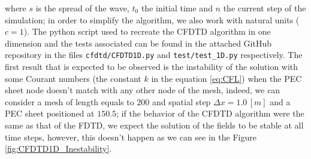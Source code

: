 \documentclass[12pt, oneside]{book}
\begin{document}
where $s$ is the spread of the wave, $t_0$ the initial time and $n$ the current step of the simulation; in order to simplify the algorithm, we also work with natural units ($c=1$). The python script used to recreate the CFDTD algorithm in one dimension and the tests associated can be found in the attached GitHub repository in the files \texttt{cfdtd/CFDTD1D.py} and \texttt{test/test\_1D.py} respectively. The first result that is expected to be observed is the instability of the solution with some Courant numbers (the constant $k$ in the equation \ref{eq:CFL}) when the PEC sheet node doesn't match with any other node of the mesh, indeed, we can consider a mesh of length equals to $200$ and spatial step $\Delta x = 1.0 \, [m]$ and a PEC sheet positioned at $150.5$; if the behavior of the CFDTD algorithm were the same as that of the FDTD, we expect the solution of the fields to be stable at all time steps, however, this doesn't happen as we can see in the Figure \ref{fig:CFDTD1D_Inestability}.
\end{document}
